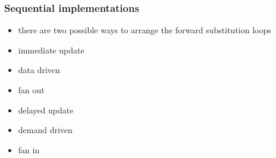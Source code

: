 \begin{frame}[fragile]
%
  \frametitle{Sequential implementations}
%
  \begin{itemize}
  \item there are two possible ways to arrange the forward substitution loops 
  \end{itemize}
%
  \begin{minipage}{.45\linewidth}
    \small
    \begin{algorithm}[H]
%
      \dontprintsemicolon
      \nocaptionofalgo
%
%
    \end{algorithm}
%
    \begin{itemize}
    \item immediate update
    \item data driven
    \item fan out
    \end{itemize}
%
  \end{minipage}
%
  \hfill
%
  \begin{minipage}{.45\linewidth}
    \small
    \begin{algorithm}[H]
%
      \dontprintsemicolon
      \nocaptionofalgo
%
%
    \end{algorithm}
%
    \begin{itemize}
    \item delayed update
    \item demand driven
    \item fan in
    \end{itemize}
%
  \end{minipage}
%
\end{frame}

